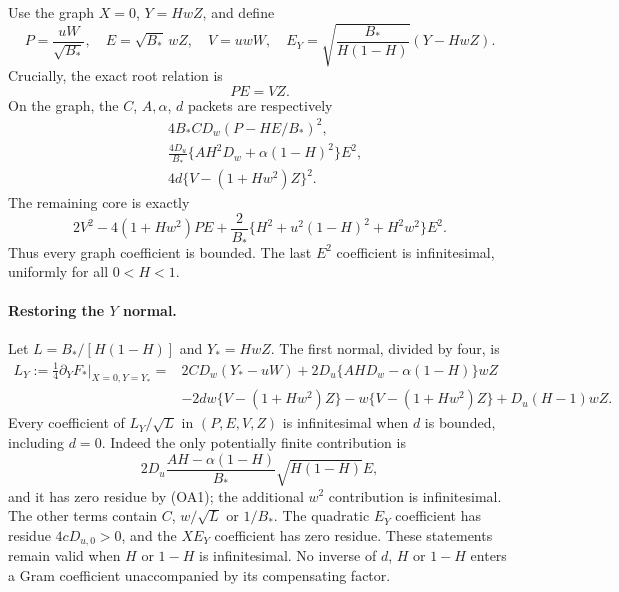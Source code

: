Use the graph $X=0$, $Y=HwZ$, and define
\[
 P=\frac{uW}{\sqrt{B_*}},\quad E=\sqrt{B_*}\,wZ,
 \quad V=uwW,\quad
 E_Y=\sqrt{\frac{B_*}{H(1-H)}}(Y-HwZ).
\tag{OA3}
\]
Crucially, the exact root relation is
\[
 PE=VZ.\tag{OA4}
\]
On the graph, the $C$, $A,\alpha$, $d$ packets are respectively
\begin{align*}
 &4B_*CD_w(P-HE/B_*)^2,\\
 &\frac{4D_u}{B_*}\{AH^2D_w+\alpha(1-H)^2\}E^2,\\
 &4d\{V-(1+Hw^2)Z\}^2.
\end{align*}
The remaining core is exactly
\[
 2V^2-4(1+Hw^2)PE
 +\frac{2}{B_*}\{H^2+u^2(1-H)^2+H^2w^2\}E^2.
\tag{OA5}
\]
Thus every graph coefficient is bounded.  The last $E^2$ coefficient is
infinitesimal, uniformly for all $0<H<1$.

\paragraph{Restoring the $Y$ normal.}
Let $L=B_*/[H(1-H)]$ and $Y_*=HwZ$.
The first normal, divided by four, is
\begin{align*}
 L_Y:=\frac14\partial_YF_*\big|_{X=0,Y=Y_*}
={}&2CD_w(Y_*-uW)+2D_u\{AH D_w-\alpha(1-H)\}wZ\\
&-2dw\{V-(1+Hw^2)Z\}
 -w\{V-(1+Hw^2)Z\}+D_u(H-1)wZ.
\tag{OA6}
\end{align*}
Every coefficient of $L_Y/\sqrt L$ in $(P,E,V,Z)$ is infinitesimal
when $d$ is bounded, including $d=0$.  Indeed the only potentially finite contribution is
\[
 2D_u\frac{AH-\alpha(1-H)}{B_*}\sqrt{H(1-H)}E,
\]
and it has zero residue by (OA1); the additional $w^2$ contribution is
infinitesimal.  The other terms contain $C$, $w/\sqrt L$ or $1/B_*$.
The quadratic $E_Y$ coefficient has residue $4cD_{u,0}>0$, and the
$X E_Y$ coefficient has zero residue.  These statements remain valid
when $H$ or $1-H$ is infinitesimal.  No inverse of $d$, $H$ or $1-H$ enters a Gram coefficient
unaccompanied by its compensating factor.

